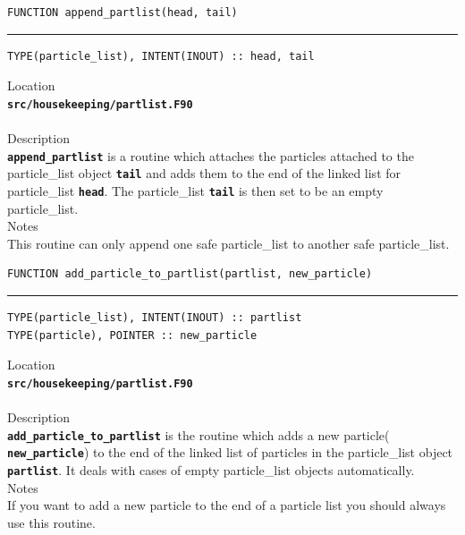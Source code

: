 \documentclass[12pt,a4paper]{article}
\newcommand{\HRule}{\rule{\linewidth}{0.5mm}}
\newcommand{\inlinecode}[1]{{\color{warwickred} \bf\texttt{#1}}}
\newcommand{\codedef}{\begin{Verbatim}[formatcom=\color{warwickred},fontsize=\Large,hfuzz=0pt]}
\newcommand{\coderule}{
{\color{warwickred}\vspace{-0.5cm}\HRule}
\codedef}
\begin{document}
\pagebreak
\codedef
FUNCTION append_partlist(head, tail)
\end{Verbatim}
\coderule
TYPE(particle_list), INTENT(INOUT) :: head, tail
\end{Verbatim}
\vspace{1cm}
{\Large Location\\}
\inlinecode{src/housekeeping/partlist.F90}\\
\\[0.5cm]
{\Large Description\\}
\inlinecode{append\_partlist} is a routine which attaches the particles
attached to the particle\_list object \inlinecode{tail} and adds them to the end
of the linked list for particle\_list \inlinecode{head}. The particle\_list
\inlinecode{tail} is then set to be an empty particle\_list.
\\[0.5cm]
{\Large Notes\\}
This routine can only append one safe particle\_list to another safe
particle\_list.

\pagebreak
\codedef
FUNCTION add_particle_to_partlist(partlist, new_particle)
\end{Verbatim}
\coderule
TYPE(particle_list), INTENT(INOUT) :: partlist
TYPE(particle), POINTER :: new_particle
\end{Verbatim}
\vspace{1cm}
{\Large Location\\}
\inlinecode{src/housekeeping/partlist.F90}\\
\\[0.5cm]
{\Large Description\\}
\inlinecode{add\_particle\_to\_partlist} is the routine which adds a new particle(\inlinecode{new\_particle})
to the end of the linked list of particles in the particle\_list object
\inlinecode{partlist}. It deals with cases of empty particle\_list objects
automatically.
\\[0.5cm]
{\Large Notes\\}
If you want to add a new particle to the end of a particle list you should
always use this routine.
\end{document}
